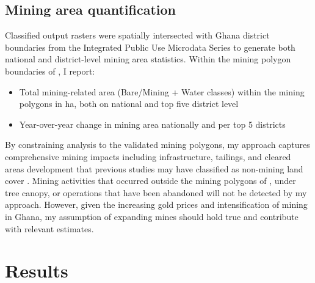 \documentclass[]{interact}
\begin{document}
\subsection{Mining area quantification}
Classified output rasters were spatially intersected with Ghana district boundaries from the Integrated Public Use Microdata Series \citep{ruggles2025Integrated} to generate both national and district-level mining area statistics. Within the mining polygon boundaries of \citet{maus2022update}, I report:

\begin{itemize}
    \item Total mining-related area (Bare/Mining + Water classes) within the mining polygons in ha, both on national and top five district level
    \item Year-over-year change in mining area nationally and per top 5 districts
\end{itemize}

By constraining analysis to the validated mining polygons, my approach captures comprehensive mining impacts including infrastructure, tailings, and cleared areas development that previous studies may have classified as non-mining land cover \citep{barenblitt2021large}. Mining activities that occurred outside the mining polygons of \citet{maus2022update}, under tree canopy, or operations that have been abandoned will not be detected by my approach. However, given the increasing gold prices and intensification of mining in Ghana, my assumption of expanding mines should hold true and contribute with relevant estimates. 

\section{Results}
\end{document}
